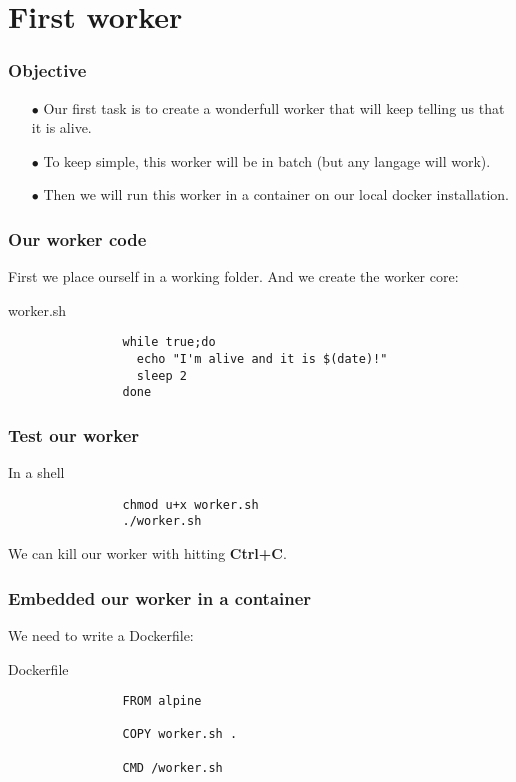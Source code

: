 \section{First worker}
	
	\begin{frame}
		\frametitle{Objective}
		
		\begin{itemize}
			\item[$\bullet$] Our first task is to create a wonderfull worker that will keep telling us that it is alive.
			\item[$\bullet$] To keep simple, this worker will be in batch (but any langage will work).	
			\item[$\bullet$] Then we will run this worker in a container on our local docker installation.
		\end{itemize}
		
	\end{frame}		
	
	\begin{frame}[fragile]
		\frametitle{Our worker code}

		First we place ourself in a working folder. And we create the worker core:
		
		\begin{block}{worker.sh}
			\begin{verbatim}
				while true;do
				  echo "I'm alive and it is $(date)!"
				  sleep 2
				done
			\end{verbatim}
		\end{block}
		
	\end{frame}

	\begin{frame}[fragile]
		\frametitle{Test our worker}
		
		\begin{block}{In a shell}
			\begin{verbatim}
				chmod u+x worker.sh
				./worker.sh
			\end{verbatim}
		\end{block}
		We can kill our worker with hitting \textbf{Ctrl+C}.
		
	\end{frame}
	
	\begin{frame}[fragile]
		\frametitle{Embedded our worker in a container}
		
		We need to write a Dockerfile:
		
		\begin{block}{Dockerfile}
			\begin{verbatim}
				FROM alpine

				COPY worker.sh .

				CMD /worker.sh
			\end{verbatim}
		\end{block}
	\end{frame}
	
